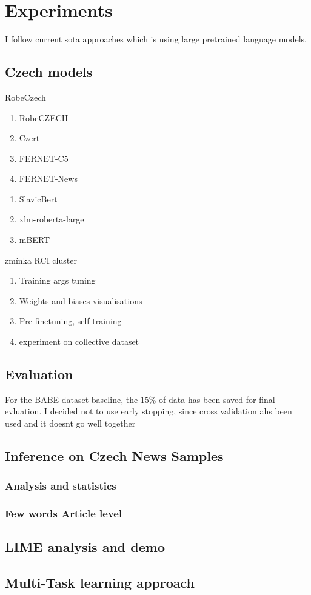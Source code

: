 \chapter{Experiments}\label{experiments}
I follow current sota approaches which is using large pretrained language models.
\section{Czech models}
RobeCzech
\begin{enumerate}
    \item RobeCZECH
    \item Czert
    \item FERNET-C5
    \item FERNET-News
\end{enumerate}

\begin{enumerate}
    \item SlavicBert
    \item xlm-roberta-large
    \item mBERT
\end{enumerate}
zmínka RCI cluster
\begin{enumerate}
    \item Training args tuning
    \item Weights and biases visualisations
    \item Pre-finetuning, self-training
    \item experiment on collective dataset
\end{enumerate}

\section{Evaluation}
For the BABE dataset baseline, the 15\% of data has been saved for final evluation. I decided not to use early stopping, since cross validation ahs been used and it doesnt go well together
\section{Inference on Czech News Samples}
\subsection{Analysis and statistics}
\subsection{Few words Article level}

\section{LIME analysis and demo}

\section{Multi-Task learning approach}\label{mtl}